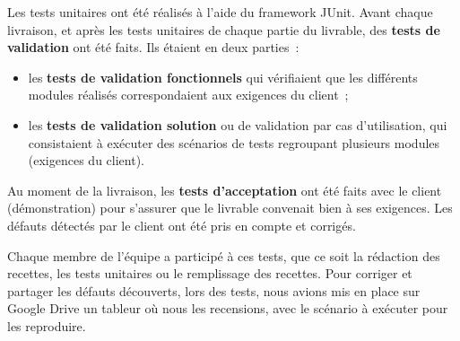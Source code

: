 \documentclass[hidelinks, 10pt,a4paper]{article}
\begin{document}
    Les tests unitaires ont été réalisés à l’aide du framework JUnit.  
    Avant chaque livraison, et après les tests unitaires de chaque partie du livrable, des \textbf{tests de validation} ont été faits.  
    Ils étaient en deux parties~: 
    \begin{itemize}
     \item les \textbf{tests de validation fonctionnels} qui vérifiaient que   
      les différents modules réalisés correspondaient aux exigences du client~;
     \item les \textbf{tests de validation solution} ou de validation par cas d’utilisation, qui 
      consistaient à exécuter des scénarios de tests regroupant plusieurs modules (exigences du client). 
    \end{itemize} 
    Au moment de la livraison, les \textbf{tests d'acceptation} ont été faits avec le client (démonstration) pour 
    s'assurer que le livrable convenait bien à ses exigences.
    Les défauts détectés par le client ont été pris en compte et corrigés.
    
    Chaque membre de l'équipe a participé à ces tests, que ce soit la rédaction des recettes, 
    les tests unitaires ou le remplissage des recettes. Pour corriger et partager les défauts découverts, lors des tests, nous avions
    mis en place sur Google Drive un tableur où nous les recensions, avec le scénario à exécuter pour les reproduire.
    

   
\end{document}
